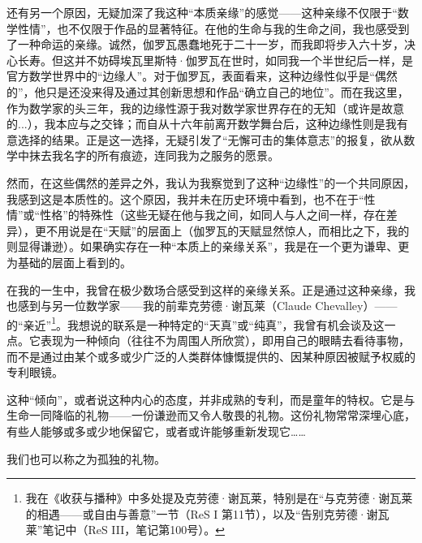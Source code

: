 还有另一个原因，无疑加深了我这种“本质亲缘”的感觉——这种亲缘不仅限于“数学性情”，也不仅限于作品的显著特征。在他的生命与我的生命之间，我也感受到了一种命运的亲缘。诚然，伽罗瓦愚蠢地死于二十一岁，而我即将步入六十岁，决心长寿。但这并不妨碍埃瓦里斯特·伽罗瓦在世时，如同我一个半世纪后一样，是官方数学世界中的“边缘人”。对于伽罗瓦，表面看来，这种边缘性似乎是“偶然的”，他只是还没来得及通过其创新思想和作品“确立自己的地位”。而在我这里，作为数学家的头三年，我的边缘性源于我对数学家世界存在的无知（或许是故意的...），我本应与之交锋；而自从十六年前离开数学舞台后，这种边缘性则是我有意选择的结果。正是这一选择，无疑引发了“无懈可击的集体意志”的报复，欲从数学中抹去我名字的所有痕迹，连同我为之服务的愿景。

然而，在这些偶然的差异之外，我认为我察觉到了这种“边缘性”的一个共同原因，我感到这是本质性的。这个原因，我并未在历史环境中看到，也不在于“性情”或“性格”的特殊性（这些无疑在他与我之间，如同人与人之间一样，存在差异），更不用说是在“天赋”的层面上（伽罗瓦的天赋显然惊人，而相比之下，我的则显得谦逊）。如果确实存在一种“本质上的亲缘关系”，我是在一个更为谦卑、更为基础的层面上看到的。

在我的一生中，我曾在极少数场合感受到这样的亲缘关系。正是通过这种亲缘，我也感到与另一位数学家——我的前辈克劳德·谢瓦莱（Claude Chevalley）——的“亲近”\footnote{我在《收获与播种》中多处提及克劳德·谢瓦莱，特别是在“与克劳德·谢瓦莱的相遇——或自由与善意”一节（ReS I 第11节），以及“告别克劳德·谢瓦莱”笔记中（ReS III，笔记第100号）。}。我想说的联系是一种特定的“天真”或“纯真”，我曾有机会谈及这一点。它表现为一种倾向（往往不为周围人所欣赏），即用自己的眼睛去看待事物，而不是通过由某个或多或少广泛的人类群体慷慨提供的、因某种原因被赋予权威的专利眼镜。

这种“倾向”，或者说这种内心的态度，并非成熟的专利，而是童年的特权。它是与生命一同降临的礼物——一份谦逊而又令人敬畏的礼物。这份礼物常常深埋心底，有些人能够或多或少地保留它，或者或许能够重新发现它……

我们也可以称之为孤独的礼物。